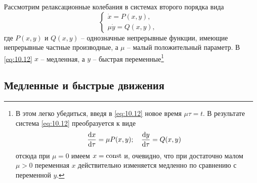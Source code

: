 Рассмотрим релаксационные колебания в системах второго порядка вида
\begin{equation}
        \label{eq:10.12}
        \begin{cases}
                \dot x = P(x,y) ,\\ 
                \mu \dot y = Q(x,y),
        \end{cases}
\end{equation}
где $P(x,y)$ и $Q(x,y)$ -- однозначные непрерывные функции, имеющие
непрерывные частные производные, а $\mu$ -- малый положительный параметр. В
\eqref{eq:10.12} $x$ -- медленная, а $y$ -- быстрая переменные\footnote{В этом легко убедиться, введя
        в \eqref{eq:10.12} новое время $\mu \tau = t$. В результате система
        \eqref{eq:10.12} преобразуется к виде
        \begin{equation}
                \label{eq:}
                \dv{x}{\tau} = \mu P(x,y);\quad \dv{y}{\tau} = Q(x,y)
        \end{equation}
        отсюда при $\mu={0}$ имеем $x= \textrm{const}$ и, очевидно, что при достаточно малом $\mu>0$ переменная $x$ действительно изменяется медленно по сравнению с переменной $y$. 
}

\subsection{Медленные и быстрые движения}%
\label{sub:10.3.1}

